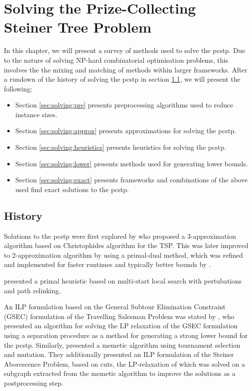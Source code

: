 \chapter{Solving the Prize-Collecting Steiner Tree Problem}
\label{chap:solving}

In this chapter, we will present a survey of methods used to solve the \gls{pcstp}. Due to the nature of solving
NP-hard combinatorial optimisation problems, this involves the the mixing and matching of methods within larger frameworks.
 After a rundown of the history of solving the \gls{pcstp} in section \ref{sec:solving:history}, we will present the following:
\begin{itemize}
\item Section \ref{sec:solving:pre} presents preprocessing algorithms used to reduce instance sizes.
\item Section \ref{sec:solving:approx} presents approximations for solving the \gls{pcstp}.
\item Section \ref{sec:solving:heuristics} presents heuristics for solving the \gls{pcstp}.
\item Section \ref{sec:solving:lower} presents methods used for generating lower bounds.
\item Section \ref{sec:solving:exact} presents frameworks and combinations of the above used find exact solutions
   to the \gls{pcstp}.
\end{itemize}

\section{History}
\label{sec:solving:history}

Solutions to the \gls{pcstp} were first explored by \citet{Bienstock1993} who
proposed a 3-approximation algorithm based on Christophides algorithm for the TSP.
This was later improved to 2-approximation algorithm by
\citet{goemans1997primal} using a primal-dual method,
which was refined and implemented
for faster runtimes and typically better
bounds by \citet{Johnson:2000:PCS:338219.338637}.

\citet{canuto2001local} presented a primal heuristic based on multi-start
local search with pertubations and path relinking.

An ILP formulation based on the General Subtour Elimination Constraint (GSEC) formulation of the Travelling Salesman Problem was
stated by \citet{lucena2004strong}, who presented an algorithm for solving the LP relaxation of the GSEC formulation using
a separation procedure as a method for generating a strong lower bound for the \gls{pcstp}. Similarly, \citet{Ljubic:2004:memetic}
presented a memetic algorithm using tournament selection and mutation. They additionally presented an ILP formulation of the Steiner
 Aborescence Problem, based on cuts, the LP-relaxation of which was solved on a subgraph extracted from the memetic algorithm to
 improve the solutions as a postprocessing step.

